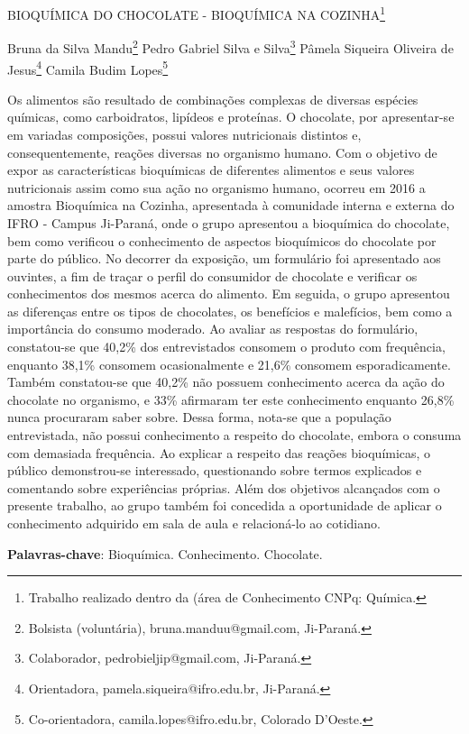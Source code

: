 \documentclass[article,12pt,onesidea,4paper,english,brazil]{abntex2}
\begin{document}
	
	
	\frenchspacing 
	
	\begin{center}
		\LARGE BIOQUÍMICA DO CHOCOLATE - BIOQUÍMICA NA COZINHA\footnote{Trabalho realizado dentro da (área de Conhecimento CNPq: Química.}
		
		\normalsize
		Bruna da Silva Mandu\footnote{Bolsista (voluntária), bruna.manduu@gmail.com, Ji-Paraná.} 
		Pedro Gabriel Silva e Silva\footnote{Colaborador, pedrobieljip@gmail.com, Ji-Paraná.} 
		Pâmela Siqueira Oliveira de Jesus\footnote{Orientadora, pamela.siqueira@ifro.edu.br, Ji-Paraná.} 
		Camila Budim Lopes\footnote{Co-orientadora, camila.lopes@ifro.edu.br, Colorado D’Oeste.} 
	\end{center}
	
	\noindent Os alimentos são resultado de combinações complexas de diversas espécies químicas, como carboidratos, lipídeos e proteínas. O chocolate, por apresentar-se em variadas composições, possui valores nutricionais distintos e, consequentemente, reações diversas no organismo humano. Com o objetivo de expor as características bioquímicas de diferentes alimentos e seus valores nutricionais assim como sua ação no organismo humano, ocorreu em 2016 a amostra Bioquímica na Cozinha, apresentada à comunidade interna e externa do IFRO - Campus Ji-Paraná, onde o grupo apresentou a bioquímica do chocolate, bem como verificou o conhecimento de aspectos bioquímicos do chocolate por parte do público. No decorrer da exposição, um formulário foi apresentado aos ouvintes, a fim de traçar o perfil do consumidor de chocolate e verificar os conhecimentos dos mesmos acerca do alimento. Em seguida, o grupo apresentou as diferenças entre os tipos de chocolates, os benefícios e malefícios, bem como a importância do consumo moderado. Ao avaliar as respostas do formulário, constatou-se que 40,2\% dos entrevistados consomem o produto com frequência, enquanto 38,1\% consomem ocasionalmente e 21,6\% consomem esporadicamente. Também constatou-se que 40,2\% não possuem conhecimento acerca da ação do chocolate no organismo, e 33\% afirmaram ter este conhecimento enquanto 26,8\% nunca procuraram saber sobre. Dessa forma, nota-se que a população entrevistada, não possui conhecimento a respeito do chocolate, embora o consuma com demasiada frequência. Ao explicar a respeito das reações bioquímicas, o público demonstrou-se interessado, questionando sobre termos explicados e comentando sobre experiências próprias. Além dos objetivos alcançados com o presente trabalho, ao grupo também foi concedida a oportunidade de aplicar o conhecimento adquirido em sala de aula e relacioná-lo ao cotidiano.
	
	\vspace{\onelineskip}
	
	\noindent
	\textbf{Palavras-chave}: Bioquímica. Conhecimento. Chocolate.
	
\end{document}
